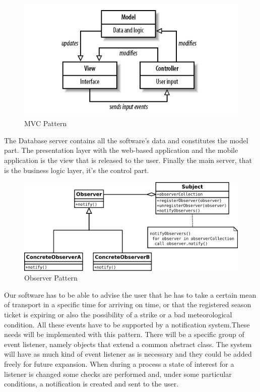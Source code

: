 \begin{figure}[H]
	\centering
	\includegraphics[scale=0.4]{Images/Patterns/MVC_Pattern}
	\caption{MVC Pattern}
\end{figure}
The Database server contains all the software’s data and constitutes the model part. The presentation layer with the web-based application and the mobile application is the view that is released to the user. Finally the main server,  that is the business logic layer, it’s the control part.

\begin{figure}[H]
	\centering
	\includegraphics[scale=0.45]{Images/Patterns/Observer_Pattern}
	\caption{Observer Pattern}
\end{figure}
Our software has to be able to advise the user that he has to take a certain mean of transport in a specific time for arriving on time, or that the registered season ticket is expiring or also the possibility of a strike or a bad meteorological condition. All these events have to be supported by a notification system.These needs will be implemented with this pattern.  There will be a specific group of event listener, namely objects that extend a common abstract class. The system will have as much kind of event listener as is necessary and they could be added freely for future expansion. When during a process a state of interest for a listener is changed some checks are performed and, under some particular conditions, a notification is created and sent to the user. 

